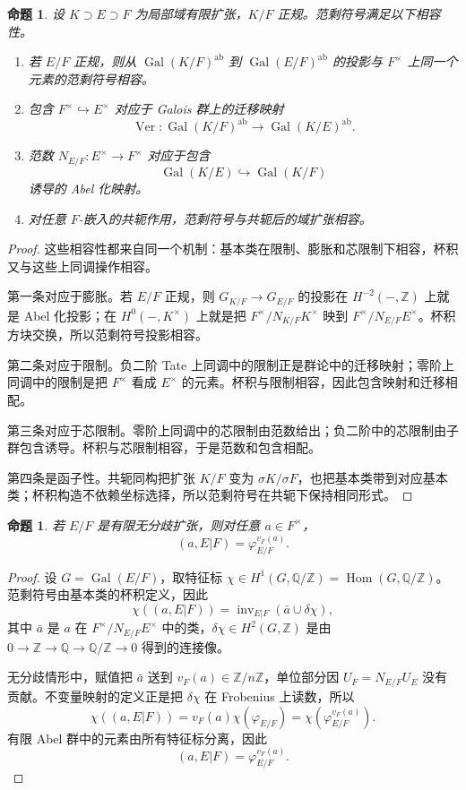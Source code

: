 \documentclass[11pt,a4paper,openany]{ctexbook}
\numberwithin{equation}{chapter}
\newcommand{\Q}{\mathbb{Q}}
\newcommand{\Z}{\mathbb{Z}}
\newcommand{\Gal}{\operatorname{Gal}}
\theoremstyle{plain}
\newtheorem{proposition}[theorem]{命题}
\theoremstyle{definition}
\theoremstyle{remark}
\begin{document}
\begin{proposition}
设 $K\supset E\supset F$ 为局部域有限扩张，$K/F$ 正规。范剩符号满足以下相容性。
\begin{enumerate}
\item 若 $E/F$ 正规，则从 $\Gal(K/F)^{\operatorname{ab}}$ 到 $\Gal(E/F)^{\operatorname{ab}}$ 的投影与 $F^\times$ 上同一个元素的范剩符号相容。
\item 包含 $F^\times\hookrightarrow E^\times$ 对应于 Galois 群上的迁移映射
\[
\operatorname{Ver}:\Gal(K/F)^{\operatorname{ab}}\to \Gal(K/E)^{\operatorname{ab}}.
\]
\item 范数 $N_{E/F}:E^\times\to F^\times$ 对应于包含
\[
\Gal(K/E)\hookrightarrow \Gal(K/F)
\]
诱导的 Abel 化映射。
\item 对任意 $F$-嵌入的共轭作用，范剩符号与共轭后的域扩张相容。
\end{enumerate}
\end{proposition}

\begin{proof}
这些相容性都来自同一个机制：基本类在限制、膨胀和芯限制下相容，杯积又与这些上同调操作相容。

第一条对应于膨胀。若 $E/F$ 正规，则 $G_{K/F}\to G_{E/F}$ 的投影在 $H^{-2}(-,\Z)$ 上就是 Abel 化投影；在 $H^0(-,K^\times)$ 上就是把 $F^\times/N_{K/F}K^\times$ 映到 $F^\times/N_{E/F}E^\times$。杯积方块交换，所以范剩符号投影相容。

第二条对应于限制。负二阶 Tate 上同调中的限制正是群论中的迁移映射；零阶上同调中的限制是把 $F^\times$ 看成 $E^\times$ 的元素。杯积与限制相容，因此包含映射和迁移相配。

第三条对应于芯限制。零阶上同调中的芯限制由范数给出；负二阶中的芯限制由子群包含诱导。杯积与芯限制相容，于是范数和包含相配。

第四条是函子性。共轭同构把扩张 $K/F$ 变为 $\sigma K/\sigma F$，也把基本类带到对应基本类；杯积构造不依赖坐标选择，所以范剩符号在共轭下保持相同形式。
\end{proof}

\begin{proposition}
若 $E/F$ 是有限无分歧扩张，则对任意 $a\in F^\times$，
\[
(a,E|F)=\varphi_{E/F}^{v_F(a)}.
\]
\end{proposition}

\begin{proof}
设 $G=\Gal(E/F)$，取特征标 $\chi\in H^1(G,\Q/\Z)=\operatorname{Hom}(G,\Q/\Z)$。范剩符号由基本类的杯积定义，因此
\[
\chi((a,E|F))=\operatorname{inv}_{E|F}(\bar a\cup\delta\chi),
\]
其中 $\bar a$ 是 $a$ 在 $F^\times/N_{E/F}E^\times$ 中的类，$\delta\chi\in H^2(G,\Z)$ 是由 $0\to\Z\to\Q\to\Q/\Z\to0$ 得到的连接像。

无分歧情形中，赋值把 $\bar a$ 送到 $v_F(a)\in\Z/n\Z$，单位部分因 $U_F=N_{E/F}U_E$ 没有贡献。不变量映射的定义正是把 $\delta\chi$ 在 Frobenius 上读数，所以
\[
\chi((a,E|F))=v_F(a)\chi(\varphi_{E/F})
=\chi(\varphi_{E/F}^{v_F(a)}).
\]
有限 Abel 群中的元素由所有特征标分离，因此
\[
(a,E|F)=\varphi_{E/F}^{v_F(a)}.
\]
\end{proof}
\end{document}
